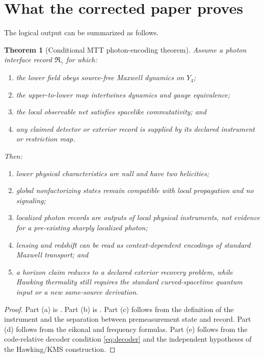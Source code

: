 \documentclass[11pt,a4paper]{article}
\numberwithin{equation}{section}
\newtheorem{theorem}{Theorem}[section]
\theoremstyle{definition}
\theoremstyle{remark}
\begin{document}
\section{What the corrected paper proves}

The logical output can be summarized as follows.

\begin{theorem}[Conditional MTT photon-encoding theorem]
\label{thm:conditional-photon}
Assume a photon interface record \(\mathfrak R_\gamma\) for which:
\begin{enumerate}[label=(\roman*)]
\item the lower field obeys source-free Maxwell dynamics on \(Y_4\);
\item the upper-to-lower map intertwines dynamics and gauge equivalence;
\item the local observable net satisfies spacelike commutativity; and
\item any claimed detector or exterior record is supplied by its
declared instrument or restriction map.
\end{enumerate}
Then:
\begin{enumerate}[label=(\alph*)]
\item lower physical characteristics are null and have two helicities;
\item global nonfactorizing states remain compatible with local
propagation and no signaling;
\item localized photon records are outputs of local physical
instruments, not evidence for a pre-existing sharply localized photon;
\item lensing and redshift can be read as context-dependent encodings of
standard Maxwell transport; and
\item a horizon claim reduces to a declared exterior recovery problem,
while Hawking thermality still requires the standard curved-spacetime
quantum input or a new same-source derivation.
\end{enumerate}
\end{theorem}

\begin{proof}
Part (a) is .  Part (b) is
.  Part (c) follows from the definition of the
instrument and the separation between premeasurement state and record.
Part (d) follows from the eikonal and frequency formulas.  Part (e)
follows from the code-relative decoder condition \eqref{eq:decoder} and
the independent hypotheses of the Hawking/KMS construction.
\end{proof}
\end{document}
